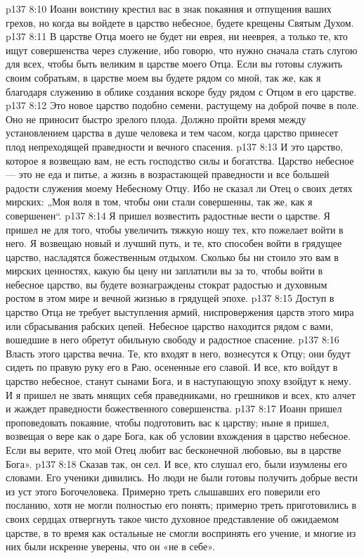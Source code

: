 \vs p137 8:10 Иоанн воистину крестил вас в знак покаяния и отпущения ваших грехов, но когда вы войдете в царство небесное, будете крещены Святым Духом.
\vs p137 8:11 В царстве Отца моего не будет ни еврея, ни нееврея, а только те, кто ищут совершенства через служение, ибо говорю, что нужно сначала стать слугою для всех, чтобы быть великим в царстве моего Отца. Если вы готовы служить своим собратьям, в царстве моем вы будете рядом со мной, так же, как я благодаря служению в облике создания вскоре буду рядом с Отцом в его царстве.
\vs p137 8:12 Это новое царство подобно семени, растущему на доброй почве в поле. Оно не приносит быстро зрелого плода. Должно пройти время между установлением царства в душе человека и тем часом, когда царство принесет плод непреходящей праведности и вечного спасения.
\vs p137 8:13 И это царство, которое я возвещаю вам, не есть господство силы и богатства. Царство небесное --- это не еда и питье, а жизнь в возрастающей праведности и все большей радости служения моему Небесному Отцу. Ибо не сказал ли Отец о своих детях мирских: „Моя воля в том, чтобы они стали совершенны, так же, как я совершенен“.
\vs p137 8:14 Я пришел возвестить радостные вести о царстве. Я пришел не для того, чтобы увеличить тяжкую ношу тех, кто пожелает войти в него. Я возвещаю новый и лучший путь, и те, кто способен войти в грядущее царство, насладятся божественным отдыхом. Сколько бы ни стоило это вам в мирских ценностях, какую бы цену ни заплатили вы за то, чтобы войти в небесное царство, вы будете вознаграждены стократ радостью и духовным ростом в этом мире и вечной жизнью в грядущей эпохе.
\vs p137 8:15 Доступ в царство Отца не требует выступления армий, ниспровержения царств этого мира или сбрасывания рабских цепей. Небесное царство находится рядом с вами, вошедшие в него обретут обильную свободу и радостное спасение.
\vs p137 8:16 Власть этого царства вечна. Те, кто входят в него, вознесутся к Отцу; они будут сидеть по правую руку его в Раю, осененные его славой. И все, кто войдут в царство небесное, станут сынами Бога, и в наступающую эпоху взойдут к нему. И я пришел не звать мнящих себя праведниками, но грешников и всех, кто алчет и жаждет праведности божественного совершенства.
\vs p137 8:17 Иоанн пришел проповедовать покаяние, чтобы подготовить вас к царству; ныне я пришел, возвещая о вере как о даре Бога, как об условии вхождения в царство небесное. Если вы верите, что мой Отец любит вас бесконечной любовью, вы в царстве Бога».
\vs p137 8:18 \pc Сказав так, он сел. И все, кто слушал его, были изумлены его словами. Его ученики дивились. Но люди не были готовы получить добрые вести из уст этого Богочеловека. Примерно треть слышавших его поверили его посланию, хотя не могли полностью его понять; примерно треть приготовились в своих сердцах отвергнуть такое чисто духовное представление об ожидаемом царстве, в то время как остальные не смогли воспринять его учение, и многие из них были искренне уверены, что он «не в себе».
